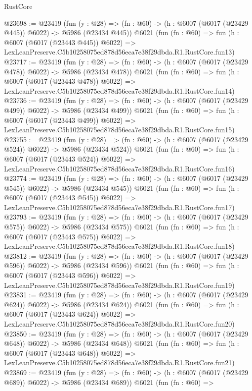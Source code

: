 \begin{lexlean}{RustCore}
\begin{coremodule}
@23698 := @23419
    (fun (y : @28) => (fn : @60) -> (h : @6007 (@6017 (@23429 @445)) @6022) -> @5986 (@23434 @445))
    @6021
    (fun (fn : @60) =>
    fun (h : @6007 (@6017 (@23443 @445)) @6022) =>
    LexLeanPreserve.C5b10258075ed878d56eca7e38f29dbda.R1.RustCore.fun13)
@23717 := @23419
    (fun (y : @28) => (fn : @60) -> (h : @6007 (@6017 (@23429 @478)) @6022) -> @5986 (@23434 @478))
    @6021
    (fun (fn : @60) =>
    fun (h : @6007 (@6017 (@23443 @478)) @6022) =>
    LexLeanPreserve.C5b10258075ed878d56eca7e38f29dbda.R1.RustCore.fun14)
@23736 := @23419
    (fun (y : @28) => (fn : @60) -> (h : @6007 (@6017 (@23429 @499)) @6022) -> @5986 (@23434 @499))
    @6021
    (fun (fn : @60) =>
    fun (h : @6007 (@6017 (@23443 @499)) @6022) =>
    LexLeanPreserve.C5b10258075ed878d56eca7e38f29dbda.R1.RustCore.fun15)
@23755 := @23419
    (fun (y : @28) => (fn : @60) -> (h : @6007 (@6017 (@23429 @524)) @6022) -> @5986 (@23434 @524))
    @6021
    (fun (fn : @60) =>
    fun (h : @6007 (@6017 (@23443 @524)) @6022) =>
    LexLeanPreserve.C5b10258075ed878d56eca7e38f29dbda.R1.RustCore.fun16)
@23774 := @23419
    (fun (y : @28) => (fn : @60) -> (h : @6007 (@6017 (@23429 @545)) @6022) -> @5986 (@23434 @545))
    @6021
    (fun (fn : @60) =>
    fun (h : @6007 (@6017 (@23443 @545)) @6022) =>
    LexLeanPreserve.C5b10258075ed878d56eca7e38f29dbda.R1.RustCore.fun17)
@23793 := @23419
    (fun (y : @28) => (fn : @60) -> (h : @6007 (@6017 (@23429 @575)) @6022) -> @5986 (@23434 @575))
    @6021
    (fun (fn : @60) =>
    fun (h : @6007 (@6017 (@23443 @575)) @6022) =>
    LexLeanPreserve.C5b10258075ed878d56eca7e38f29dbda.R1.RustCore.fun18)
@23812 := @23419
    (fun (y : @28) => (fn : @60) -> (h : @6007 (@6017 (@23429 @596)) @6022) -> @5986 (@23434 @596))
    @6021
    (fun (fn : @60) =>
    fun (h : @6007 (@6017 (@23443 @596)) @6022) =>
    LexLeanPreserve.C5b10258075ed878d56eca7e38f29dbda.R1.RustCore.fun19)
@23831 := @23419
    (fun (y : @28) => (fn : @60) -> (h : @6007 (@6017 (@23429 @624)) @6022) -> @5986 (@23434 @624))
    @6021
    (fun (fn : @60) =>
    fun (h : @6007 (@6017 (@23443 @624)) @6022) =>
    LexLeanPreserve.C5b10258075ed878d56eca7e38f29dbda.R1.RustCore.fun20)
@23850 := @23419
    (fun (y : @28) => (fn : @60) -> (h : @6007 (@6017 (@23429 @648)) @6022) -> @5986 (@23434 @648))
    @6021
    (fun (fn : @60) =>
    fun (h : @6007 (@6017 (@23443 @648)) @6022) =>
    LexLeanPreserve.C5b10258075ed878d56eca7e38f29dbda.R1.RustCore.fun21)
@23869 := @23419
    (fun (y : @28) => (fn : @60) -> (h : @6007 (@6017 (@23429 @689)) @6022) -> @5986 (@23434 @689))
    @6021
    (fun (fn : @60) =>

\end{coremodule}
\end{lexlean}
